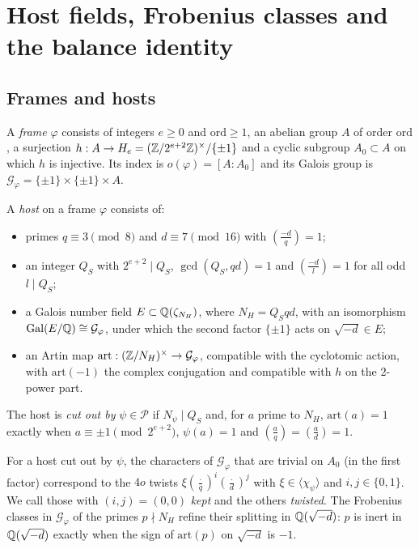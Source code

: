 \section{Host fields, Frobenius classes and the balance identity}\label{sec:hosts}

\subsection{Frames and hosts}

\begin{definition}[Frames]\label{def:frame}
A \emph{frame} $\varphi$ consists of integers $e\ge0$ and $\mathrm{ord}\ge1$, an abelian group $A$ of
order $\mathrm{ord}$, a surjection $h:A\to H_e=(\mathbb{Z}/2^{e+2}\mathbb{Z})^\times/\{\pm1\}$ and a cyclic subgroup
$A_0\subset A$ on which $h$ is injective. Its index is $o(\varphi)=[A:A_0]$ and its Galois group is
$\mathcal G_\varphi=\{\pm1\}\times\{\pm1\}\times A$. 
\end{definition}

\begin{definition}[Hosts]\label{def:host}
A \emph{host} on a frame $\varphi$ consists of:
\begin{itemize}
\item primes $q\equiv3\pmod8$ and $d\equiv7\pmod{16}$ with $(\frac{-d}{q})=1$;
\item an integer $Q_S$ with $2^{e+2}\mid Q_S$, $\gcd(Q_S,qd)=1$ and $(\frac{-d}{l})=1$ for all odd
$l\mid Q_S$;
\item a Galois number field $E\subset\mathbb{Q}(\zeta_{N_H})$, where $N_H=Q_Sqd$, with an isomorphism
$\operatorname{Gal}(E/\mathbb{Q})\cong\mathcal G_\varphi$, under which the second factor $\{\pm1\}$ acts on $\sqrt{-d}\in E$;
\item an Artin map $\mathrm{art}:(\mathbb{Z}/N_H)^\times\to\mathcal G_\varphi$, compatible with the cyclotomic
action, with $\mathrm{art}(-1)$ the complex conjugation and compatible with $h$ on the $2$-power part.
\end{itemize}
The host is \emph{cut out by} $\psi\in\mathcal P$ if $N_\psi\mid Q_S$ and, for $a$ prime to $N_H$,
$\mathrm{art}(a)=1$ exactly when $a\equiv\pm1\pmod{2^{e+2}}$, $\psi(a)=1$ and
$(\frac aq)=(\frac ad)=1$.  
\end{definition}

For a host cut out by $\psi$, the characters of $\mathcal G_\varphi$ that are trivial on $A_0$ (in the
first factor) correspond to the $4o$ twists $\xi(\frac{\cdot}{q})^i(\frac{\cdot}{d})^j$ with
$\xi\in\langle\chi_\psi\rangle$ and $i,j\in\{0,1\}$. We call those with $(i,j)=(0,0)$ \emph{kept} and the
others \emph{twisted}. The Frobenius classes in $\mathcal G_\varphi$ of the primes $p\nmid N_H$ refine
their splitting in $\mathbb{Q}(\sqrt{-d})$: $p$ is inert in $\mathbb{Q}(\sqrt{-d})$ exactly when the sign of
$\mathrm{art}(p)$ on $\sqrt{-d}$ is $-1$.

